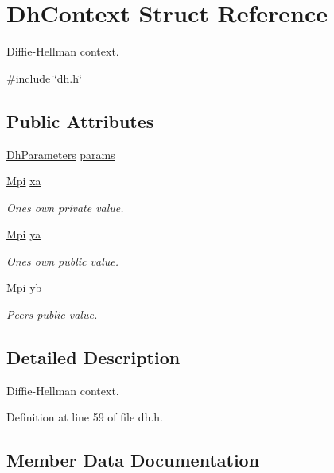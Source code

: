 \hypertarget{structDhContext}{}\section{Dh\+Context Struct Reference}
\label{structDhContext}


Diffie-\/\+Hellman context.  




{\ttfamily \#include \char`\"{}dh.\+h\char`\"{}}

\subsection*{Public Attributes}
\begin{DoxyCompactItemize}
\item 
\hyperlink{structDhParameters}{Dh\+Parameters} \hyperlink{structDhContext_a1e218bee95f1683ea9d872258e573ebd}{params}
\item 
\hyperlink{structMpi}{Mpi} \hyperlink{structDhContext_a3ceed075dd7b13ffe3fac2c5cbe7bde2}{xa}
\begin{DoxyCompactList}\small\item\em One\textquotesingle{}s own private value. \end{DoxyCompactList}\item 
\hyperlink{structMpi}{Mpi} \hyperlink{structDhContext_a50340bb658bc72754cd25ccfcc53c619}{ya}
\begin{DoxyCompactList}\small\item\em One\textquotesingle{}s own public value. \end{DoxyCompactList}\item 
\hyperlink{structMpi}{Mpi} \hyperlink{structDhContext_a4b1597110a34d09fea578a71a564ac3e}{yb}
\begin{DoxyCompactList}\small\item\em Peer\textquotesingle{}s public value. \end{DoxyCompactList}\end{DoxyCompactItemize}


\subsection{Detailed Description}
Diffie-\/\+Hellman context. 

Definition at line 59 of file dh.\+h.



\subsection{Member Data Documentation}
\mbox{\label{structDhContext_a1e218bee95f1683ea9d872258e573ebd}} 
